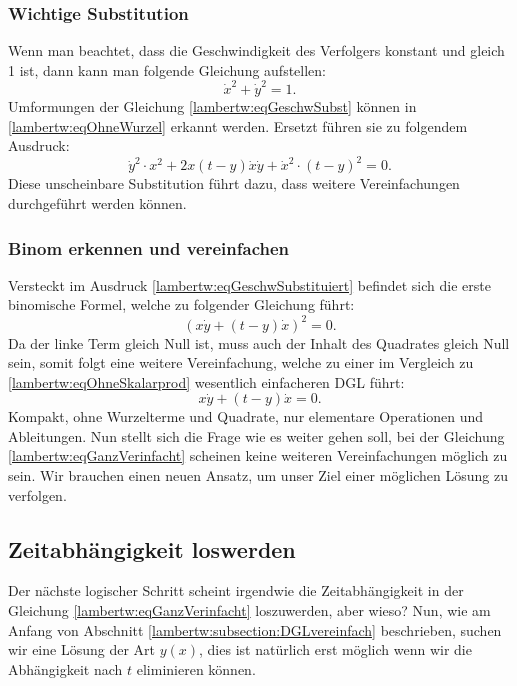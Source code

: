 \subsubsection{Wichtige Substitution
	\label{lambertw:subsubsection:WichtSubst}}
Wenn man beachtet, dass die Geschwindigkeit des Verfolgers konstant und gleich 1 ist, dann kann man folgende Gleichung aufstellen: 
\begin{equation}
	\dot{x}^2 + \dot{y}^2 
	= 1.
	\label{lambertw:eqGeschwSubst}
\end{equation}
Umformungen der Gleichung \eqref{lambertw:eqGeschwSubst} können in \eqref{lambertw:eqOhneWurzel} erkannt werden. Ersetzt führen sie zu folgendem Ausdruck:
\begin{equation}
		\dot{y}^2 \cdot x^2 +2x \left(t-y\right) \dot{x}\dot{y} + \dot{x}^2 \cdot \left(t-y\right)^2
		=0.
		\label{lambertw:eqGeschwSubstituiert}
\end{equation}
Diese unscheinbare Substitution führt dazu, dass weitere Vereinfachungen durchgeführt werden können.

\subsubsection{Binom erkennen und vereinfachen
	\label{lambertw:subsubsection:BinomVereinfach}}
Versteckt im Ausdruck \eqref{lambertw:eqGeschwSubstituiert} befindet sich die erste binomische Formel, welche zu folgender Gleichung führt:
\begin{equation}
	(x \dot{y} + (t-y) \dot{x})^2
	= 0.
	\label{lambertw:eqAlgVerinfacht}
\end{equation}
Da der linke Term gleich Null ist, muss auch der Inhalt des Quadrates gleich Null sein, somit folgt eine weitere Vereinfachung, welche zu einer im Vergleich zu \eqref{lambertw:eqOhneSkalarprod} wesentlich einfacheren DGL führt:
\begin{equation}
	x \dot{y} + (t-y) \dot{x}
	= 0.
	\label{lambertw:eqGanzVerinfacht}
\end{equation}
Kompakt, ohne Wurzelterme und Quadrate, nur elementare Operationen und Ableitungen. Nun stellt sich die Frage wie es weiter gehen soll, bei der Gleichung \eqref{lambertw:eqGanzVerinfacht} scheinen keine weiteren Vereinfachungen möglich zu sein. Wir brauchen einen neuen Ansatz, um unser Ziel einer möglichen Lösung zu verfolgen.

\subsection{Zeitabhängigkeit loswerden
	\label{lambertw:subsection:ZeitabhLoswerden}}
Der nächste logischer Schritt scheint irgendwie die Zeitabhängigkeit in der Gleichung \eqref{lambertw:eqGanzVerinfacht} loszuwerden, aber wieso? Nun, wie am Anfang von Abschnitt \ref{lambertw:subsection:DGLvereinfach} beschrieben, suchen wir eine Lösung der Art \(y(x)\), dies ist natürlich erst möglich wenn wir die Abhängigkeit nach \(t\) eliminieren können.

